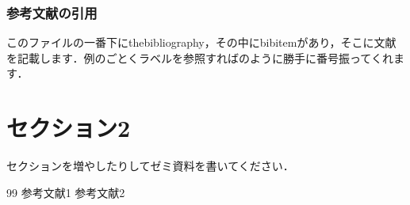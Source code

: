 \documentclass[12pt]{jsarticle}
\begin{document}
  \subsubsection{参考文献の引用}
    このファイルの一番下にthebibliography，その中にbibitemがあり，そこに文献を記載します．例のごとくラベルを参照すれば\cite{cite1}のように勝手に番号振ってくれます．

\newpage %

\section{セクション2}
  セクションを増やしたりしてゼミ資料を書いてください．

\begin{thebibliography}{99}
  参考文献1
  参考文献2
\end{thebibliography}
\end{document}
